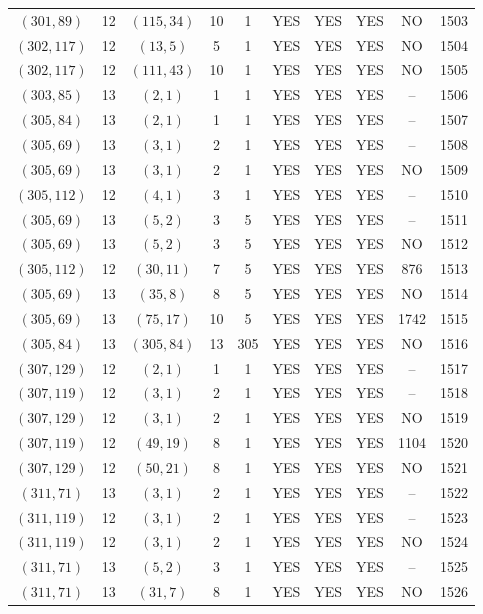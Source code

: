 \begin{longtable}{|c|c|c|c|c|c|c|c|c|c|}
$(301, 89)$ & 12 & $(115, 34)$ & 10 & 1 & YES & YES & YES & NO & 1503\\
$(302, 117)$ & 12 & $(13, 5)$ & 5 & 1 & YES & YES & YES & NO & 1504\\
$(302, 117)$ & 12 & $(111, 43)$ & 10 & 1 & YES & YES & YES & NO & 1505\\
$(303, 85)$ & 13 & $(2, 1)$ & 1 & 1 & YES & YES & YES & -- & 1506\\
$(305, 84)$ & 13 & $(2, 1)$ & 1 & 1 & YES & YES & YES & -- & 1507\\
$(305, 69)$ & 13 & $(3, 1)$ & 2 & 1 & YES & YES & YES & -- & 1508\\
$(305, 69)$ & 13 & $(3, 1)$ & 2 & 1 & YES & YES & YES & NO & 1509\\
$(305, 112)$ & 12 & $(4, 1)$ & 3 & 1 & YES & YES & YES & -- & 1510\\
$(305, 69)$ & 13 & $(5, 2)$ & 3 & 5 & YES & YES & YES & -- & 1511\\
$(305, 69)$ & 13 & $(5, 2)$ & 3 & 5 & YES & YES & YES & NO & 1512\\
$(305, 112)$ & 12 & $(30, 11)$ & 7 & 5 & YES & YES & YES & 876 & 1513\\
$(305, 69)$ & 13 & $(35, 8)$ & 8 & 5 & YES & YES & YES & NO & 1514\\
$(305, 69)$ & 13 & $(75, 17)$ & 10 & 5 & YES & YES & YES & 1742 & 1515\\
$(305, 84)$ & 13 & $(305, 84)$ & 13 & 305 & YES & YES & YES & NO & 1516\\
$(307, 129)$ & 12 & $(2, 1)$ & 1 & 1 & YES & YES & YES & -- & 1517\\
$(307, 119)$ & 12 & $(3, 1)$ & 2 & 1 & YES & YES & YES & -- & 1518\\
$(307, 129)$ & 12 & $(3, 1)$ & 2 & 1 & YES & YES & YES & NO & 1519\\
$(307, 119)$ & 12 & $(49, 19)$ & 8 & 1 & YES & YES & YES & 1104 & 1520\\
$(307, 129)$ & 12 & $(50, 21)$ & 8 & 1 & YES & YES & YES & NO & 1521\\
$(311, 71)$ & 13 & $(3, 1)$ & 2 & 1 & YES & YES & YES & -- & 1522\\
$(311, 119)$ & 12 & $(3, 1)$ & 2 & 1 & YES & YES & YES & -- & 1523\\
$(311, 119)$ & 12 & $(3, 1)$ & 2 & 1 & YES & YES & YES & NO & 1524\\
$(311, 71)$ & 13 & $(5, 2)$ & 3 & 1 & YES & YES & YES & -- & 1525\\
$(311, 71)$ & 13 & $(31, 7)$ & 8 & 1 & YES & YES & YES & NO & 1526\\

\end{longtable}
